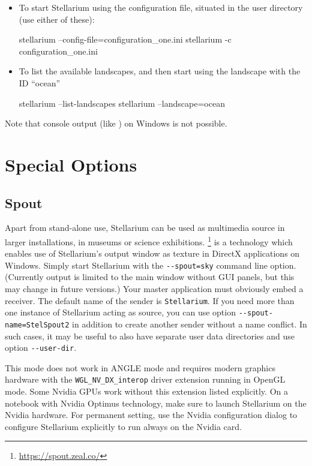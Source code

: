 \begin{itemize}
\item To start Stellarium using the configuration file,
   situated in the user directory (use either of
  these):

\begin{commands}
stellarium --config-file=configuration_one.ini
stellarium -c configuration_one.ini
\end{commands}

\item To list the available landscapes, and then start using the
  landscape with the ID ``ocean''
\begin{commands}
stellarium --list-landscapes 
stellarium --landscape=ocean
\end{commands}
\end{itemize}

\noindent Note that console output (like ) on Windows is not possible. 

\section{Special Options}
\label{sec:CommandLineOptions:Special}
\subsection{Spout} 
\label{sec:CommandLineOptions:Special:Spout}
Apart from stand-alone use, Stellarium can be used as multimedia source in larger installations, in museums or science exhibitions. 
\footnote{\url{https://spout.zeal.co/}} is a technology which enables use of Stellarium's 
output window as texture in DirectX applications on Windows. Simply start Stellarium with 
the \texttt{-\/-spout=sky} command line option. (Currently  output is limited to the main window 
without GUI panels, but this may change in future versions.) 
Your master application must obviously embed a  receiver. 
The default name of the  sender is \texttt{Stellarium}. If you need more than one instance of Stellarium acting as source, 
you can use option \texttt{-\/-spout-name=StelSpout2} in addition to create another  sender without a name conflict. 
In such cases, it may be useful to also have separate user data directories and use option \texttt{-\/-user-dir}. 

This mode does not work in ANGLE mode and requires modern graphics hardware with the \texttt{WGL\_NV\_DX\_interop} 
driver extension running in OpenGL mode. Some Nvidia GPUs work without this extension listed explicitly. 
On a notebook with Nvidia Optimus technology, make sure to launch Stellarium on the Nvidia hardware. 
For permanent setting, use the Nvidia configuration dialog to configure Stellarium explicitly to run always on the Nvidia card.

